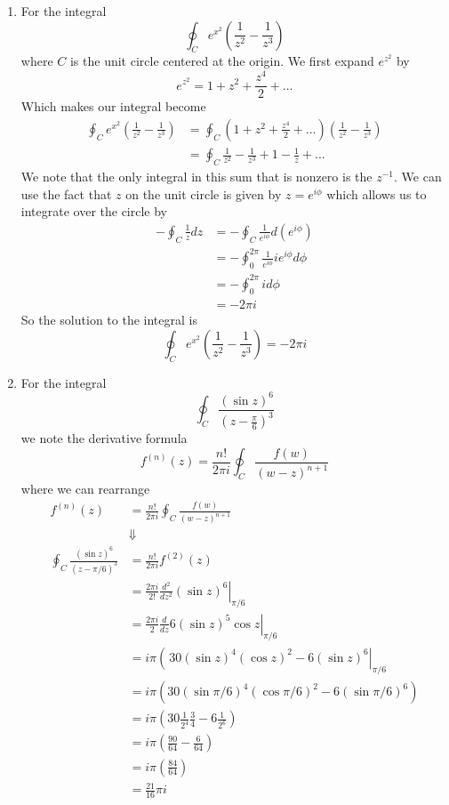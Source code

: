 \documentclass[11pt]{article}
\numberwithin{equation}{section}
\begin{document}
\begin{enumerate}[1)]
\item For the integral
$$\oint_{C}e^{x^2}\left(\frac{1}{z^2}-\frac{1}{z^3}\right)$$
where $C$ is the unit circle centered at the origin. We first expand $e^{z^2}$ by
$$e^{z^2} = 1 + z^2 + \frac{z^4}{2} +...$$
Which makes our integral become
\begin{align*}
\oint_{C}e^{x^2}\left(\frac{1}{z^2}-\frac{1}{z^3}\right) &= \oint_{C}(1 + z^2 + \frac{z^4}{2} +...)\left(\frac{1}{z^2}-\frac{1}{z^3}\right)\\
&= \oint_{C}\frac{1}{z^2} - \frac{1}{z^3} + 1 - \frac{1}{z} + ...
\end{align*}
We note that the only integral in this sum that is nonzero is the $z^{-1}$. We can use the
fact that $z$ on the unit circle is given by $z=e^{i\phi}$ which allows us to integrate over
the circle by
\begin{align*}
-\oint_{C}\frac{1}{z}dz &= -\oint_{C}\frac{1}{e^{i\phi}}d(e^{i\phi}) \\
&= -\oint_{0}^{2\pi}\frac{1}{e^{i\phi}}ie^{i\phi}d\phi \\
&= -\oint_{0}^{2\pi}id\phi \\
&= -2\pi{i}
\end{align*}
So the solution to the integral is
$$\oint_{C}e^{x^2}\left(\frac{1}{z^2}-\frac{1}{z^3}\right) = -2\pi i$$

\item For the integral 
$$\oint_{C} \frac{(\sin{z})^6}{(z-\frac{\pi}{6})^3}$$ 
we note the derivative formula
$$f^{(n)}(z) = \frac{n!}{2\pi{i}}\oint_{C}\frac{f(w)}{(w-z)^{n+1}}$$
where we can rearrange
\begin{align*}
f^{(n)}(z) &= \frac{n!}{2\pi{i}}\oint_{C}\frac{f(w)}{(w-z)^{n+1}}\\
&\Downarrow\\
\oint_{C}\frac{(\sin{z})^6}{(z-\pi/6)^{3}} &= \frac{n!}{2\pi{i}}f^{(2)}(z)\\
&= \left.\frac{2\pi{i}}{2!}\frac{d^2}{dz^2}(\sin{z})^6\right|_{\pi/6}\\
&= \left.\frac{2\pi{i}}{2}\frac{d}{dz}6(\sin{z})^5\cos{z}\right|_{\pi/6}\\
&= i\pi\left(\frac{}{}30(\sin{z})^4(\cos{z})^2-6(\sin{z})^6\right|_{\pi/6}\\
&= i\pi\left(30(\sin{\pi/6})^4(\cos{\pi/6})^2-6(\sin{\pi/6})^6\right)\\
&= i\pi\left(30\frac{1}{2^4}\frac{3}{4}-6\frac{1}{2^6}\right)\\
&= i\pi\left(\frac{90}{64}-\frac{6}{64}\right)\\
&= i\pi\left(\frac{84}{64}\right)\\
&= \frac{21}{16}\pi{i}
\end{align*}

\end{enumerate}
\end{document}
